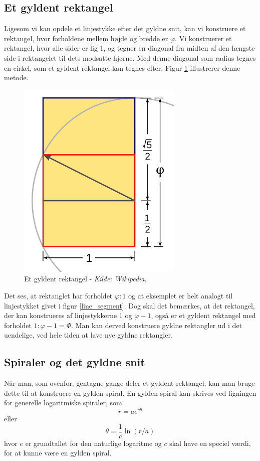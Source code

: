 {\subsection{Et gyldent rektangel}
Ligesom vi kan opdele et linjestykke efter det gyldne snit,
kan vi konstruere et rektangel, hvor forholdene mellem højde og bredde er
$\varphi$. Vi konstruerer et rektangel, hvor alle sider er lig 1, og
tegner en diagonal fra midten af den længste side i rektangelet til dets modsatte hjørne. Med
denne diagonal som radius tegnes en cirkel, som et gyldent rektangel kan
tegnes efter. Figur \ref{golden_rectangle} illustrerer denne metode.

\begin{figure}[t]
	\centering
	\includegraphics[scale=0.35,angle=0]{afsnit/baggrund/billeder/Golden_Rectangle_Construction}
	\caption[Et gyldent rektangel]{Et gyldent rektangel - \emph{Kilde: Wikipedia}.}
	\label{golden_rectangle}
\end{figure}

Det ses, at rektanglet har forholdet $\varphi:1$ og at eksemplet er helt
analogt til linjestykket givet i figur \ref{line_segment}. Dog skal
det bemærkes, at det rektangel, der kan konstrueres af linjestykkerne 1
og $\varphi - 1$, også er et gyldent rektangel med forholdet $1:\varphi
-1 = \varPhi$. Man kan derved konstruere gyldne rektangler ud i det
uendelige, ved hele tiden at lave nye gyldne rektangler.

\subsection{Spiraler og det gyldne snit}
Når man, som ovenfor, gentagne gange deler et gyldent rektangel, kan man
bruge dette til at konstruere en gylden spiral. En gylden spiral kan
skrives ved ligningen for generelle logaritmiske spiraler, som
\begin{equation}
	r = ae^{c\theta}
	\label{log_spiral_2}
\end{equation}
eller
\begin{equation}
	\theta = \frac{1}{c}\ln(r/a)
	\label{log_spiral_1}
\end{equation}
hvor $e$ er grundtallet for den naturlige logaritme og $c$ skal have en
speciel værdi, for at kunne være en gylden spiral.

}

